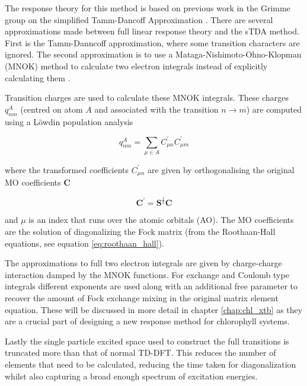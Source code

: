 The response theory for this method is based on previous work in the Grimme group
on the simplified Tamm-Dancoff Approximation \cite{Grimme2013}. There are several
approximations made between full linear response theory and the sTDA method. First
is the Tamm-Danncoff approximation, where some transition characters are ignored. 
The second approximation is to use a Mataga-Nishimoto-Ohno-Klopman (MNOK) method 
to calculate two electron integrals instead of explicitly calculating them \cite{Nishimoto1957, Ohno1964, Klopman1964}.

Transition charges are used to calculate these MNOK integrals. These charges $q^A_{nm}$
(centred on atom $A$ and associated with the transition $ n \rightarrow m$) are
computed using a Löwdin population analysis

\begin{equation}
q_{nm}^A = \sum_{\mu \in A} C^\prime_{\mu n} C^\prime_{\mu m}
\end{equation}

where the transformed coefficients $C^\prime_{\mu n}$ are given by orthogonalising
the original MO coefficients $\textbf{C}$

\begin{equation}
\textbf{C}^\prime = \textbf{S}^{\frac{1}{2}} \textbf{C}
\end{equation}

and $\mu$ is an index that runs over the atomic orbitals (AO). The MO coefficients
are the solution of diagonalizing the Fock matrix (from the Roothaan-Hall equations,
see equation \ref{eq:roothaan_hall}).

The approximations to full two electron integrals are given by charge-charge interaction
damped by the MNOK functions. For exchange and Coulomb type integrals different 
exponents are used along with an additional free parameter to recover the amount 
of Fock exchange mixing in the original matrix element equation. These will be discussed
in more detail in chapter \ref{chap:chl_xtb} as they are a crucial part of designing 
a new response method for chlorophyll systems.

Lastly the single particle excited space used to construct the full transitions
is truncated more than that of normal TD-DFT. This reduces the number of elements
that need to be calculated, reducing the time taken for diagonalization whilst also
capturing a broad enough spectrum of excitation energies. 

